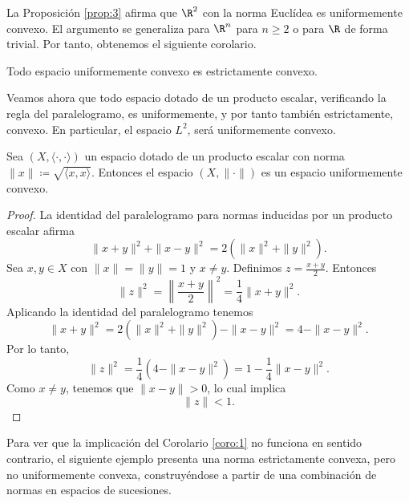 La Proposición \ref{prop:3} afirma que $ \R^2 $ con la norma Euclídea es uniformemente convexo. El argumento se generaliza para $ \R^n $ para $ n \geq 2 $ o para $ \R $ de forma trivial. Por tanto, obtenemos el siguiente corolario.

\begin{corollary} \label{coro:1}
    Todo espacio uniformemente convexo es estrictamente convexo.
\end{corollary}

Veamos ahora que todo espacio dotado de un producto escalar, verificando la regla del paralelogramo, es uniformemente, y por tanto también estrictamente, convexo. En particular, el espacio $ L^2 $, será uniformemente convexo.

\begin{proposition} \label{prop:hilbert-convex}
    Sea $ (X, \langle \cdot, \cdot \rangle) $ un espacio dotado de un producto escalar con norma $ \|x\| \coloneq \sqrt{\langle x, x \rangle} $. Entonces el espacio $ (X, \|\cdot\|) $ es un espacio uniformemente convexo.
\end{proposition}
\begin{proof}
    La identidad del paralelogramo para normas inducidas por un producto escalar afirma
    \begin{equation}
        \|x + y\|^2 + \|x - y\|^2 = 2(\|x\|^2 + \|y\|^2).
    \end{equation}
    Sea \(x, y \in X\) con \(\|x\| = \|y\| = 1\) y \(x \neq y\). Definimos \(z = \frac{x + y}{2}\).  
    Entonces
    \begin{equation}
    \|z\|^2 = \left\|\frac{x + y}{2}\right\|^2 = \frac{1}{4} \|x + y\|^2.
    \end{equation}
    Aplicando la identidad del paralelogramo tenemos
    \begin{equation}
    \|x + y\|^2 = 2(\|x\|^2 + \|y\|^2) - \|x - y\|^2 = 4 - \|x - y\|^2.
    \end{equation}
    Por lo tanto,
    \begin{equation}
    \|z\|^2 = \frac{1}{4}(4 - \|x - y\|^2) = 1 - \frac{1}{4} \|x - y\|^2.
    \end{equation}
    Como \(x \neq y\), tenemos que \(\|x - y\| > 0\), lo cual implica
    \begin{equation}
    \|z\| < 1.
    \end{equation}
\end{proof}

Para ver que la implicación del Corolario \ref{coro:1} no funciona en sentido contrario, el siguiente ejemplo presenta una norma estrictamente convexa, pero no uniformemente convexa, construyéndose a partir de una combinación de normas en espacios de sucesiones.

